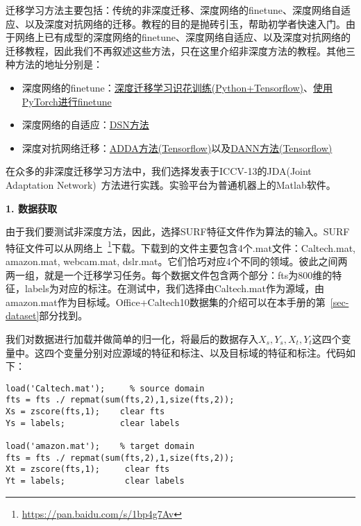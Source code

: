 迁移学习方法主要包括：传统的非深度迁移、深度网络的finetune、深度网络自适应、以及深度对抗网络的迁移。教程的目的是抛砖引玉，帮助初学者快速入门。由于网络上已有成型的深度网络的finetune、深度网络自适应、以及深度对抗网络的迁移教程，因此我们不再叙述这些方法，只在这里介绍非深度方法的教程。其他三种方法的地址分别是：

\begin{itemize}
	\item 深度网络的finetune：\href{https://cosx.org/2017/10/transfer-learning/}{深度迁移学习识花训练(Python+Tensorflow)}、\href{https://github.com/miguelgfierro/sciblog_support/blob/master/A_Gentle_Introduction_to_Transfer_Learning/Intro_Transfer_Learning.ipynb}{使用PyTorch进行finetune}
	\item 深度网络的自适应：\href{https://github.com/tensorflow/models/tree/master/research/domain_adaptation}{DSN方法}
	\item 深度对抗网络迁移：\href{https://github.com/erictzeng/adda}{ADDA方法(Tensorflow)}以及\href{https://github.com/jindongwang/tf-dann}{DANN方法(Tensorflow)}
\end{itemize}


在众多的非深度迁移学习方法中，我们选择发表于ICCV-13的JDA(Joint Adaptation Network)~\cite{long2013transfer}方法进行实践。实验平台为普通机器上的Matlab软件。

\textbf{1. 数据获取}

由于我们要测试非深度方法，因此，选择SURF特征文件作为算法的输入。SURF特征文件可以从网络上~\footnote{\url{https://pan.baidu.com/s/1bp4g7Av}}下载。下载到的文件主要包含4个.mat文件：Caltech.mat, amazon.mat, webcam.mat, dslr.mat。它们恰巧对应4个不同的领域。彼此之间两两一组，就是一个迁移学习任务。每个数据文件包含两个部分：fts为800维的特征，labels为对应的标注。在测试中，我们选择由Caltech.mat作为源域，由amazon.mat作为目标域。Office+Caltech10数据集的介绍可以在本手册的第~\ref{sec-dataset}部分找到。

我们对数据进行加载并做简单的归一化，将最后的数据存入$X_s,Y_s,X_t,Y_t$这四个变量中。这四个变量分别对应源域的特征和标注、以及目标域的特征和标注。代码如下：

\begin{lstlisting}[title=Matlab加载数据, frame=shadowbox]
load('Caltech.mat');     % source domain
fts = fts ./ repmat(sum(fts,2),1,size(fts,2)); 
Xs = zscore(fts,1);    clear fts
Ys = labels;           clear labels

load('amazon.mat');    % target domain
fts = fts ./ repmat(sum(fts,2),1,size(fts,2)); 
Xt = zscore(fts,1);     clear fts
Yt = labels;            clear labels
\end{lstlisting}

